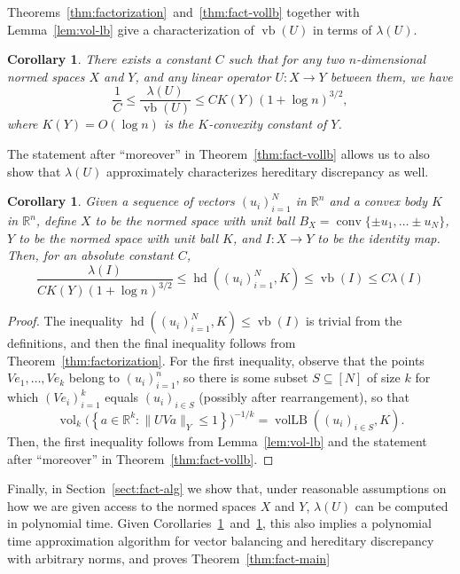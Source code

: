 \documentclass[11pt]{article}
\newtheorem{corollary}[theorem]{Corollary}
\newcommand{\R}{{\mathbb{R}}}
\newcommand{\set}[1]{\left\{ #1 \right\}}
\DeclareMathOperator{\vollb}{volLB}
\DeclareMathOperator{\hd}{hd}
\DeclareMathOperator{\vb}{vb}
\DeclareMathOperator{\vol}{vol}
\DeclareMathOperator{\conv}{conv}
\begin{document}
Theorems~\ref{thm:factorization}~and~\ref{thm:fact-vollb} together
with Lemma~\ref{lem:vol-lb} give a characterization of $\vb(U)$ in
terms of $\lambda(U)$.

\begin{corollary}\label{cor:vb-apx}
  There exists a constant $C$ such that for any two $n$-dimensional
  normed spaces $X$ and $Y$, and any linear operator $U:X \to Y$
  between them, we have
  \[
  \frac1C \le \frac{\lambda(U)}{\vb(U)} \le C K(Y) (1 + \log n)^{3/2},
  \]
  where $K(Y) = O(\log n)$ is the $K$-convexity constant of $Y$. 
\end{corollary}

The statement after ``moreover'' in Theorem~\ref{thm:fact-vollb}
allows us to also show that $\lambda(U)$ approximately characterizes
hereditary discrepancy as well.
\begin{corollary}\label{cor:hd-apx}
  Given a sequence of vectors $(u_i)_{i = 1}^N$ in $\R^n$ and a convex
  body $K$ in $\R^n$, define $X$ to be the normed space with
  unit ball $B_X = \conv\{\pm u_1, \ldots \pm u_N\}$, $Y$ to be
  the normed space with unit ball $K$, and $I:X \to Y$ to be the
  identity map. Then, for an absolute constant $C$,
  \[
  \frac{\lambda(I)}{C K(Y) (1 + \log n)^{3/2}} 
  \le \hd((u_i)_{i = 1}^N, K) \le \vb(I) 
  \le C \lambda(I)
  \]
\end{corollary}
\begin{proof}
 The inequality $\hd((u_i)_{i = 1}^N, K) \le \vb(I)$ is trivial from
 the definitions, and then the final inequality follows from
 Theorem~\ref{thm:factorization}. For the first inequality, observe
 that the points $Ve_1, \ldots, Ve_k$ belong to $(u_i)_{i = 1}^n$, so
 there is some subset $S \subseteq [N]$ of size $k$ for which
 $(Ve_i)_{i = 1}^k$ equals $(u_i)_{i \in S}$ (possibly after
 rearrangement), so that 
 \[
 \vol_k\bigl(\set{a \in \R^k: \|UV a\|_Y \le 1}\bigr)^{-1/k} =
 \vollb((u_i)_{i \in S}, K).
 \]
 Then, the first inequality follows from Lemma~\ref{lem:vol-lb} and
 the statement after ``moreover'' in Theorem~\ref{thm:fact-vollb}.
\end{proof}

Finally, in Section~\ref{sect:fact-alg} we show that, under reasonable
assumptions on how we are given access to the normed spaces $X$ and
$Y$, $\lambda(U)$ can be computed in polynomial time. Given
Corollaries~\ref{cor:vb-apx}~and~\ref{cor:hd-apx}, this also implies a
polynomial time approximation algorithm for vector balancing and
hereditary discrepancy with arbitrary norms, and proves Theorem~\ref{thm:fact-main}
\end{document}
